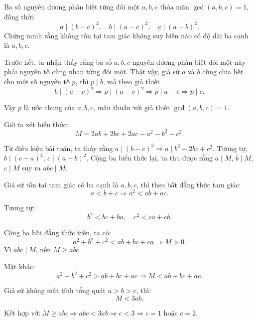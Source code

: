 \ifshowproblemandsoln
\ifshowproblem\begin{problem}[\gls{BW 2015}/P19]\label{problem:BW-2015-P19}\fi
\ifshowsoln\begin{problem}\fi
    Ba số nguyên dương phân biệt từng đôi một \( a, b, c \) thỏa mãn \( \gcd(a,b,c) = 1 \), đồng thời:
    \[
        a \mid (b - c)^2,\quad b \mid (a - c)^2,\quad c \mid (a - b)^2.
    \]
    Chứng minh rằng không tồn tại tam giác không suy biến nào có độ dài ba cạnh là \( a, b, c \).
\end{problem}
\fi

\ifshowsoln
\begin{soln}\footnotemark
    Trước hết, ta nhận thấy rằng ba số \( a, b, c \) nguyên dương phân biệt đôi một này phải nguyên tố cùng nhau từng đôi một.
    Thật vậy, giả sử \( a \) và \( b \) cùng chia hết cho một số nguyên tố \( p \), thì \( p \mid b \), mà theo giả thiết 
    \[ b \mid (a - c)^2 \Rightarrow p \mid (a - c)^2 \Rightarrow p \mid a - c \Rightarrow p \mid c. \]
    
    Vậy \( p \) là ước chung của \( a, b, c \), mâu thuẫn với giả thiết \( \gcd(a, b, c) = 1 \).

    Giờ ta xét biểu thức:
    \[
        M = 2ab + 2bc + 2ac - a^2 - b^2 - c^2.
    \]
    
    Từ điều kiện bài toán, ta thấy rằng \( a \mid (b - c)^2 \Rightarrow a \mid b^2 - 2bc + c^2 \). Tương tự, \( b \mid (c - a)^2 \), \( c \mid (a - b)^2 \).
    Cộng ba biểu thức lại, ta thu được rằng \( a \mid M \), \( b \mid M \), \( c \mid M \) suy ra \( abc \mid M \).

    Giả sử tồn tại tam giác có ba cạnh là \( a, b, c \), thì theo bất đẳng thức tam giác:
    \[
        a < b + c \Rightarrow a^2 < ab + ac.
    \]

    Tương tự:
    \[
        b^2 < bc + ba,\quad c^2 < ca + cb.
    \]

    Cộng ba bất đẳng thức trên, ta có:
    \[
        a^2 + b^2 + c^2 < ab + bc + ca \Rightarrow M > 0.
    \]
    Vì \( abc \mid M \), nên \( M \ge abc \).

    Mặt khác:
    \[
        a^2 + b^2 + c^2 > ab + bc + ac \Rightarrow M < ab + bc + ac.
    \]

    Giả sử không mất tính tổng quát \( a > b > c \), thì:
    \[
        M < 3ab.
    \]

    Kết hợp với \( M \ge abc \Rightarrow abc < 3ab \Rightarrow c < 3 \Rightarrow c = 1 \text{ hoặc } c = 2 \).


\end{soln}
\end{problem}
